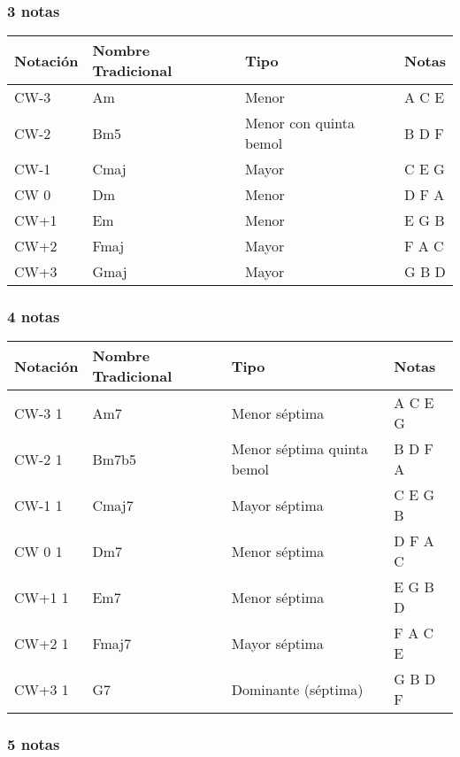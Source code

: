 \documentclass[]{article}
\begin{document}
\subsubsection*{3 notas}

\begin{table}[H]
  \centering
  \begin{tabularx}{\textwidth}{ll>{\raggedright\arraybackslash}Xl}
\toprule
Notación & Nombre Tradicional & Tipo & Notas \\
\midrule
\textsf{CW-3} & Am      & Menor & A C E \\
\textsf{CW-2} & Bm5     & Menor con quinta bemol & B D F \\
\textsf{CW-1} & Cmaj    & Mayor & C E G \\
\textsf{CW 0} & Dm      & Menor & D F A \\
\textsf{CW+1} & Em      & Menor & E G B \\
\textsf{CW+2} & Fmaj    & Mayor & F A C \\
\textsf{CW+3} & Gmaj    & Mayor & G B D \\ 
\bottomrule
\end{tabularx}
\end{table}
\subsubsection*{4 notas}

\begin{table}[H]
  \centering
  \begin{tabularx}{\textwidth}{ll>{\raggedright\arraybackslash}Xl}
\toprule
Notación & Nombre Tradicional & Tipo & Notas \\
\midrule
\textsf{CW-3} 1 & Am7     & Menor séptima & A C E G \\
\textsf{CW-2} 1 & Bm7b5   & Menor séptima quinta bemol & B D F A \\
\textsf{CW-1} 1 & Cmaj7   & Mayor séptima & C E G B \\
\textsf{CW 0} 1 & Dm7     & Menor séptima & D F A C \\
\textsf{CW+1} 1 & Em7     & Menor séptima & E G B D \\
\textsf{CW+2} 1 & Fmaj7   & Mayor séptima & F A C E \\
\textsf{CW+3} 1 & G7      & Dominante (séptima) & G B D F \\
\bottomrule
\end{tabularx}
\end{table}

\subsubsection*{5 notas}
\end{document}
